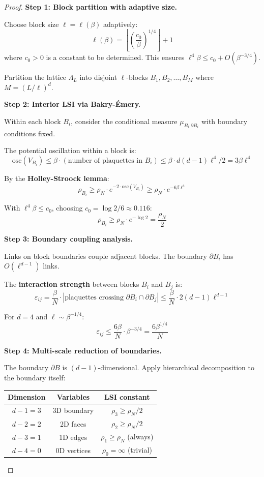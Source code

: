 \begin{proof}
\textbf{Step 1: Block partition with adaptive size.}

Choose block size $\ell = \ell(\beta)$ adaptively:
\[
\ell(\beta) = \left\lfloor \left(\frac{c_0}{\beta}\right)^{1/4} \right\rfloor + 1
\]
where $c_0 > 0$ is a constant to be determined. This ensures $\ell^4 \beta \leq c_0 + O(\beta^{-3/4})$.

Partition the lattice $\Lambda_L$ into disjoint $\ell$-blocks $B_1, B_2, \ldots, B_M$ 
where $M = (L/\ell)^d$.

\textbf{Step 2: Interior LSI via Bakry-\'Emery.}

Within each block $B_i$, consider the conditional measure $\mu_{B_i|\partial B_i}$ 
with boundary conditions fixed.

The potential oscillation within a block is:
\[
\mathrm{osc}(V_{B_i}) \leq \beta \cdot (\text{number of plaquettes in } B_i) \leq \beta \cdot d(d-1)\ell^4/2 = 3\beta\ell^4
\]

By the \textbf{Holley-Stroock lemma}:
\[
\rho_{B_i} \geq \rho_N \cdot e^{-2 \cdot \mathrm{osc}(V_{B_i})} \geq \rho_N \cdot e^{-6\beta\ell^4}
\]

With $\ell^4\beta \leq c_0$, choosing $c_0 = \log 2 / 6 \approx 0.116$:
\[
\rho_{B_i} \geq \rho_N \cdot e^{-\log 2} = \frac{\rho_N}{2}
\]

\textbf{Step 3: Boundary coupling analysis.}

Links on block boundaries couple adjacent blocks. The boundary $\partial B_i$ has 
$O(\ell^{d-1})$ links.

The \textbf{interaction strength} between blocks $B_i$ and $B_j$ is:
\[
\varepsilon_{ij} = \frac{\beta}{N} \cdot |\text{plaquettes crossing } \partial B_i \cap \partial B_j|
\leq \frac{\beta}{N} \cdot 2(d-1)\ell^{d-1}
\]

For $d=4$ and $\ell \sim \beta^{-1/4}$:
\[
\varepsilon_{ij} \leq \frac{6\beta}{N} \cdot \beta^{-3/4} = \frac{6\beta^{1/4}}{N}
\]

\textbf{Step 4: Multi-scale reduction of boundaries.}

The boundary $\partial B$ is $(d-1)$-dimensional. Apply hierarchical decomposition 
to the boundary itself:

\begin{center}
\begin{tabular}{|c|c|c|}
\hline
\textbf{Dimension} & \textbf{Variables} & \textbf{LSI constant} \\
\hline
$d-1 = 3$ & 3D boundary & $\rho_3 \geq \rho_N / 2$ \\
$d-2 = 2$ & 2D faces & $\rho_2 \geq \rho_N / 2$ \\
$d-3 = 1$ & 1D edges & $\rho_1 \geq \rho_N$ (always) \\
$d-4 = 0$ & 0D vertices & $\rho_0 = \infty$ (trivial) \\
\hline
\end{tabular}
\end{center}


\end{proof}
